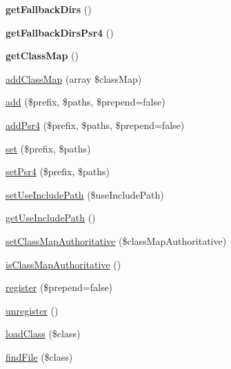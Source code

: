\begin{DoxyCompactItemize}
\item 
{\bfseries get\+Fallback\+Dirs} ()\hypertarget{classComposer_1_1Autoload_1_1ClassLoader_a9fe425ce19f8e1298cefbf5094b3c402}{}\label{classComposer_1_1Autoload_1_1ClassLoader_a9fe425ce19f8e1298cefbf5094b3c402}

\item 
{\bfseries get\+Fallback\+Dirs\+Psr4} ()\hypertarget{classComposer_1_1Autoload_1_1ClassLoader_a149bf4470ee7c50bd6b9a84b6aa4bccd}{}\label{classComposer_1_1Autoload_1_1ClassLoader_a149bf4470ee7c50bd6b9a84b6aa4bccd}

\item 
{\bfseries get\+Class\+Map} ()\hypertarget{classComposer_1_1Autoload_1_1ClassLoader_aa7d3012e1f8299ecc6c3ff3cb3f2652e}{}\label{classComposer_1_1Autoload_1_1ClassLoader_aa7d3012e1f8299ecc6c3ff3cb3f2652e}

\item 
\hyperlink{classComposer_1_1Autoload_1_1ClassLoader_a246d6f628e6ae99bf0ce65b0212f833a}{add\+Class\+Map} (array \$class\+Map)
\item 
\hyperlink{classComposer_1_1Autoload_1_1ClassLoader_aa99f46d61bdf20b924a1bb08bfcb90bd}{add} (\$prefix, \$paths, \$prepend=false)
\item 
\hyperlink{classComposer_1_1Autoload_1_1ClassLoader_a8831c0a7bb01fa44b4cb7a72ec111cf1}{add\+Psr4} (\$prefix, \$paths, \$prepend=false)
\item 
\hyperlink{classComposer_1_1Autoload_1_1ClassLoader_a76f8e2aa4329d78063cc7932108891ce}{set} (\$prefix, \$paths)
\item 
\hyperlink{classComposer_1_1Autoload_1_1ClassLoader_a11d2831d7657855b5c07cb6885dd86ef}{set\+Psr4} (\$prefix, \$paths)
\item 
\hyperlink{classComposer_1_1Autoload_1_1ClassLoader_a350f3d947ee3e29b0ac0e09e4a086642}{set\+Use\+Include\+Path} (\$use\+Include\+Path)
\item 
\hyperlink{classComposer_1_1Autoload_1_1ClassLoader_aeb0360ce32c89c3d50cf5b054aef0d59}{get\+Use\+Include\+Path} ()
\item 
\hyperlink{classComposer_1_1Autoload_1_1ClassLoader_ab393ccb89c488ca52fe97865b0957196}{set\+Class\+Map\+Authoritative} (\$class\+Map\+Authoritative)
\item 
\hyperlink{classComposer_1_1Autoload_1_1ClassLoader_abaf3d2e9cad5d740b6a29c44b36cf015}{is\+Class\+Map\+Authoritative} ()
\item 
\hyperlink{classComposer_1_1Autoload_1_1ClassLoader_a478eedf860efe1bc1b2408fc28656111}{register} (\$prepend=false)
\item 
\hyperlink{classComposer_1_1Autoload_1_1ClassLoader_a2472d57551ee473381beea31ff642136}{unregister} ()
\item 
\hyperlink{classComposer_1_1Autoload_1_1ClassLoader_aee0b004fbf0743f16dab70f8a52f983e}{load\+Class} (\$class)
\item 
\hyperlink{classComposer_1_1Autoload_1_1ClassLoader_a505e9f4e4a29f6bd47bc694e78ae46c3}{find\+File} (\$class)
\end{DoxyCompactItemize}



